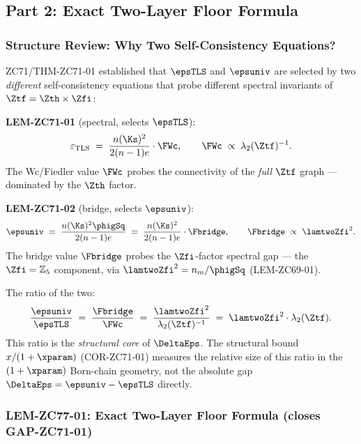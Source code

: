 \documentclass[12pt, a4paper]{article}
\begin{document}
\newpage

\subsection{Part 2: Exact Two-Layer Floor Formula}
\label{sec:twofloor}

\subsubsection{Structure Review: Why Two Self-Consistency Equations?}
\label{sec:twofloor-review}

\begin{keybox}[title={Recap: The Two Fixed-Point Equations (ZC71)}]
ZC71/THM-ZC71-01 established that $\epsTLS$ and $\epsuniv$ are selected
by two \emph{different} self-consistency equations that probe different
spectral invariants of $\Ztf = \Zth\times\Zfi$:

\textbf{LEM-ZC71-01} (spectral, selects $\epsTLS$):
\[
  \varepsilon_{\rm TLS}
  \;=\; \frac{n(\Ks)^2}{2(n-1)e} \cdot \FWc,
  \qquad \FWc \;\propto\; \lambda_2(\Ztf)^{-1}.
\]
The Wc/Fiedler value $\FWc$ probes the connectivity of the
\emph{full} $\Ztf$ graph --- dominated by the $\Zth$ factor.

\textbf{LEM-ZC71-02} (bridge, selects $\epsuniv$):
\[
  \epsuniv
  \;=\; \frac{n(\Ks)^2\phigSq}{2(n-1)e}
  \;=\; \frac{n(\Ks)^2}{2(n-1)e} \cdot \Fbridge,
  \qquad \Fbridge \;\propto\; \lamtwoZfi^2.
\]
The bridge value $\Fbridge$ probes the $\Zfi$-factor spectral gap
--- the $\Zfi = \mathbb{Z}_5$ component, via $\lamtwoZfi^2
= n_m/\phigSq$ (LEM-ZC69-01).

The ratio of the two:
\[
  \frac{\epsuniv}{\epsTLS}
  \;=\; \frac{\Fbridge}{\FWc}
  \;=\; \frac{\lamtwoZfi^2}{\lambda_2(\Ztf)^{-1}}
  \;=\; \lamtwoZfi^2 \cdot \lambda_2(\Ztf).
\]
This ratio is the \emph{structural core} of $\DeltaEps$.
The structural bound $x/(1+\xparam)$ (COR-ZC71-01) measures the
relative size of this ratio in the $(1+\xparam)$ Born-chain geometry,
not the absolute gap $\DeltaEps = \epsuniv - \epsTLS$ directly.
\end{keybox}

\subsubsection{LEM-ZC77-01: Exact Two-Layer Floor Formula (closes GAP-ZC71-01)}
\label{sec:lem01}
\end{document}
